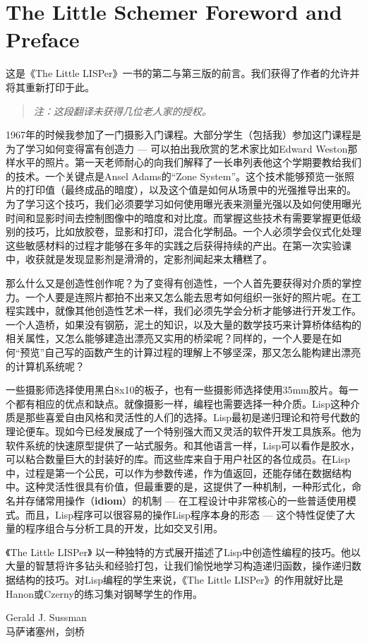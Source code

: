 \section*{The Little Schemer Foreword and Preface}
\trancontent

这是《The Little LISPer》一书的第二与第三版的前言。我们获得了作者的允许并将其重新打印于此。

\begin{quote}
\itshape
注：这段翻译未获得几位老人家的授权。
\end{quote}

1967年的时候我参加了一门摄影入门课程。大部分学生（包括我）参加这门课程是为了学习如何变得富有创造力 --- 可以拍出我欣赏的艺术家比如Edward Weston那样水平的照片。第一天老师耐心的向我们解释了一长串列表他这个学期要教给我们的技术。一个关键点是Ansel Adams的``Zone System''。这个技术能够预览一张照片的打印值（最终成品的暗度），以及这个值是如何从场景中的光强推导出来的。为了学习这个技巧，我们必须要学习如何使用曝光表来测量光强以及如何使用曝光时间和显影时间去控制图像中的暗度和对比度。而掌握这些技术有需要掌握更低级别的技巧，比如放胶卷，显影和打印，混合化学制品。一个人必须学会仪式化处理这些敏感材料的过程才能够在多年的实践之后获得持续的产出。在第一次实验课中，收获就是发现显影剂是滑滑的，定影剂闻起来太糟糕了。

那么什么又是创造性创作呢？为了变得有创造性，一个人首先要获得对介质的掌控力。一个人要是连照片都拍不出来又怎么能去思考如何组织一张好的照片呢。在工程实践中，就像其他创造性艺术一样，我们必须先学会分析才能够进行开发工作。一个人造桥，如果没有钢筋，泥土的知识，以及大量的数学技巧来计算桥体结构的相关属性，又怎么能够建造出漂亮又实用的桥梁呢？同样的，一个人要是在如何``预览''自己写的函数产生的计算过程的理解上不够坚深，那又怎么能构建出漂亮的计算机系统呢？

一些摄影师选择使用黑白8x10的板子，也有一些摄影师选择使用35mm胶片。每一个都有相应的优点和缺点。就像摄影一样，编程也需要选择一种介质。Lisp这种介质是那些喜爱自由风格和灵活性的人们的选择。Lisp最初是递归理论和符号代数的理论便车。现如今已经发展成了一个特别强大而又灵活的软件开发工具族系。他为软件系统的快速原型提供了一站式服务。和其他语言一样，Lisp可以看作是胶水，可以粘合数量巨大的封装好的库。而这些库来自于用户社区的各位成员。在Lisp中，过程是第一个公民，可以作为参数传递，作为值返回，还能存储在数据结构中。这种灵活性很具有价值，但最重要的是，这提供了一种机制，一种形式化，命名并存储常用操作（\textbf{idiom}）的机制 --- 在工程设计中非常核心的一些普适使用模式。而且，Lisp程序可以很容易的操作Lisp程序本身的形态 --- 这个特性促使了大量的程序组合与分析工具的开发，比如交叉引用。

《The Little LISPer》 以一种独特的方式展开描述了Lisp中创造性编程的技巧。他以大量的智慧将许多钻头和经验打包，让我们愉悦地学习构造递归函数，操作递归数据结构的技巧。对Lisp编程的学生来说，《The Little LISPer》的作用就好比是Hanon或Czerny的练习集对钢琴学生的作用。

{
\vspace{30pt}
\begin{flushright}
Gerald J. Sussman\\
马萨诸塞州，剑桥
\end{flushright}
}
